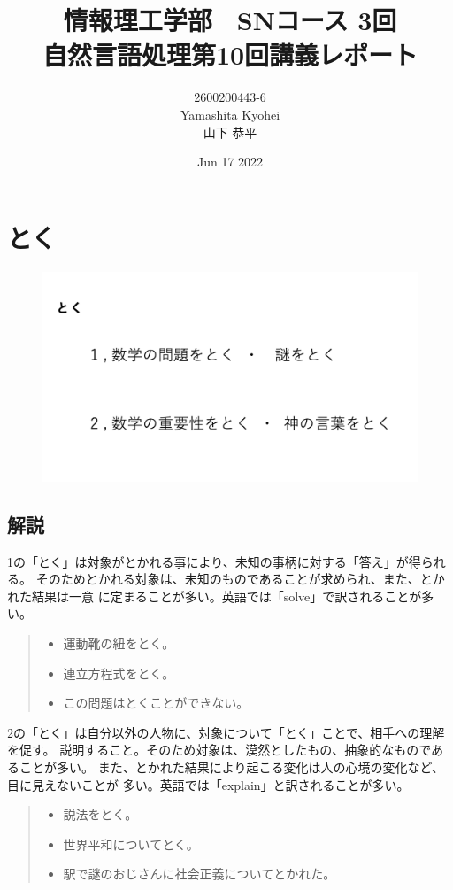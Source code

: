 \documentclass[dvipdfmx,autodetect-engine,titlepage]{jsarticle}
\title{情報理工学部　SNコース 3回\\
自然言語処理第10回講義レポート\\}
\author{2600200443-6\\Yamashita Kyohei\\山下 恭平}
\date{Jun 17 2022}
\begin{document}
\maketitle

\section{とく}

\begin{figure}[h]
  \centering
  \includegraphics[scale=0.5]{pic1.png}
\end{figure}

\subsection*{解説}

1の「とく」は対象がとかれる事により、未知の事柄に対する「答え」が得られる。
そのためとかれる対象は、未知のものであることが求められ、また、とかれた結果は一意
に定まることが多い。英語では「solve」で訳されることが多い。
\begin{quote}
  \begin{itemize}
   \item 運動靴の紐をとく。
   \item 連立方程式をとく。
   \item この問題はとくことができない。
  \end{itemize}
 \end{quote}

2の「とく」は自分以外の人物に、対象について「とく」ことで、相手への理解を促す。
説明すること。そのため対象は、漠然としたもの、抽象的なものであることが多い。
また、とかれた結果により起こる変化は人の心境の変化など、目に見えないことが
多い。英語では「explain」と訳されることが多い。
\begin{quote}
  \begin{itemize}
   \item 説法をとく。
   \item 世界平和についてとく。
   \item 駅で謎のおじさんに社会正義についてとかれた。
  \end{itemize}
 \end{quote}
\end{document}
